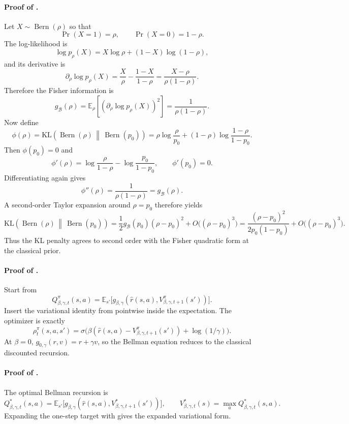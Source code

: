 \documentclass{article}
\theoremstyle{remark}
\DeclareMathOperator{\Bern}{Bern}
\newcommand{\E}{\mathbb{E}}
\newcommand{\KL}{\mathrm{KL}}
\newcommand{\cB}{\mathcal{B}}
\newcommand{\pprior}{p_0}
\newcommand{\KLbin}[2]{\KL\!\left(\Bern(#1)\,\middle\|\,\Bern(#2)\right)}
\begin{document}
\paragraph{Proof of .}
Let $X\sim\Bern(\rho)$ so that
\[
\Pr(X=1)=\rho,
\qquad
\Pr(X=0)=1-\rho.
\]
The log-likelihood is
\[
\log p_\rho(X)=X\log \rho + (1-X)\log(1-\rho),
\]
and its derivative is
\[
\partial_\rho \log p_\rho(X)=\frac{X}{\rho}-\frac{1-X}{1-\rho}=\frac{X-\rho}{\rho(1-\rho)}.
\]
Therefore the Fisher information is
\[
g_{\cB}(\rho)=\E_\rho\!\left[(\partial_\rho \log p_\rho(X))^2\right]=\frac{1}{\rho(1-\rho)}.
\]
Now define
\[
\phi(\rho)=\KLbin{\rho}{\pprior}=\rho\log\frac{\rho}{\pprior}+(1-\rho)\log\frac{1-\rho}{1-\pprior}.
\]
Then $\phi(\pprior)=0$ and
\[
\phi'(\rho)=\log\frac{\rho}{1-\rho}-\log\frac{\pprior}{1-\pprior},
\qquad
\phi'(\pprior)=0.
\]
Differentiating again gives
\[
\phi''(\rho)=\frac{1}{\rho(1-\rho)}=g_{\cB}(\rho).
\]
A second-order Taylor expansion around $\rho=\pprior$ therefore yields
\[
\KLbin{\rho}{\pprior}
=
\frac{1}{2}g_{\cB}(\pprior)(\rho-\pprior)^2 + O\bigl((\rho-\pprior)^3\bigr)
=
\frac{(\rho-\pprior)^2}{2\pprior(1-\pprior)} + O\bigl((\rho-\pprior)^3\bigr).
\]
Thus the KL penalty agrees to second order with the Fisher quadratic form at the classical prior.

\paragraph{Proof of .}
Start from
\[
Q_{\beta,\gamma,t}^{\pi}(s,a)=\E_{s'}\bigl[g_{\beta,\gamma}(\hat r(s,a),V_{\beta,\gamma,t+1}^{\pi}(s'))\bigr].
\]
Insert the variational identity from  pointwise inside the expectation.
The optimizer is exactly
\[
\rho_t^{\pi}(s,a,s')=\sigma\!\bigl(\beta(\hat r(s,a)-V_{\beta,\gamma,t+1}^{\pi}(s'))+\log(1/\gamma)\bigr).
\]
At $\beta=0$, $g_{0,\gamma}(r,v)=r+\gamma v$, so the Bellman equation reduces to the classical discounted recursion.

\paragraph{Proof of .}
The optimal Bellman recursion is
\[
Q_{\beta,\gamma,t}^*(s,a)=\E_{s'}\bigl[g_{\beta,\gamma}(\hat r(s,a),V_{\beta,\gamma,t+1}^*(s'))\bigr],
\qquad
V_{\beta,\gamma,t}^*(s)=\max_a Q_{\beta,\gamma,t}^*(s,a).
\]
Expanding the one-step target with  gives the expanded variational form.
\end{document}
